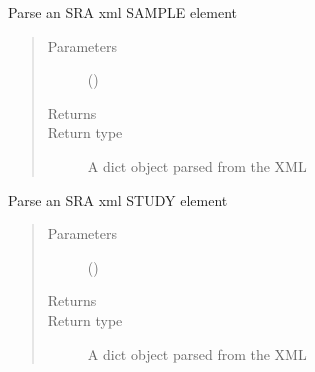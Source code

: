 \documentclass[letterpaper,10pt,english]{sphinxmanual}
\begin{document}

\begin{fulllineitems}
\label{\detokenize{omicidx.sra_parsers:omicidx.sra_parsers.parse_run_info}}
\end{fulllineitems}


\begin{fulllineitems}
\label{\detokenize{omicidx.sra_parsers:omicidx.sra_parsers.parse_sample}}
Parse an SRA xml SAMPLE element
\begin{quote}\begin{description}
\item[{Parameters}] \leavevmode
{} () \textendash{} 

\item[{Returns}] \leavevmode


\item[{Return type}] \leavevmode
A dict object parsed from the XML

\end{description}\end{quote}

\end{fulllineitems}


\begin{fulllineitems}
\label{\detokenize{omicidx.sra_parsers:omicidx.sra_parsers.parse_study}}
Parse an SRA xml STUDY element
\begin{quote}\begin{description}
\item[{Parameters}] \leavevmode
{} () \textendash{} 

\item[{Returns}] \leavevmode


\item[{Return type}] \leavevmode
A dict object parsed from the XML

\end{description}\end{quote}

\end{fulllineitems}
\end{document}
